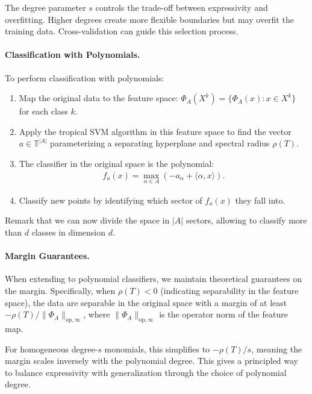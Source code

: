 \documentclass{article}
\newcommand{\trop}{\mathbb{T}}
\begin{document}
The degree parameter $s$ controls the trade-off between expressivity and overfitting. Higher degrees create more flexible boundaries but may overfit the training data. Cross-validation can guide this selection process.

\paragraph{Classification with Polynomials.}\label{subsec:poly_classification}
To perform classification with polynomials:

\begin{enumerate}
    \item Map the original data to the feature space: $\Phi_A(X^k) = \{\Phi_A(x) : x \in X^k\}$ for each class $k$.
    
    \item Apply the tropical SVM algorithm in this feature space to find the vector $a \in \trop^{|A|}$ parameterizing a separating hyperplane and spectral radius $\rho(T)$.
    
    \item The classifier in the original space is the polynomial:
    \begin{align}
    f_a(x) = \max_{\alpha \in A} (-a_\alpha + \langle \alpha, x \rangle).
    \end{align}
    
    \item Classify new points by identifying which sector of $f_a(x)$ they fall into.
\end{enumerate}

Remark that we can now divide the space in $|A|$ sectors, allowing to classify more than $d$ classes in dimension $d$.
\paragraph{Margin Guarantees.}
When extending to polynomial classifiers, we maintain theoretical guarantees on the margin. Specifically, when $\rho(T)<0$ (indicating separability in the feature space), the data are separable in the original space with a margin of at least $-\rho(T)/\lVert \Phi_A\rVert_{\text{op},\infty}$, where $\lVert \Phi_A\rVert_{\text{op},\infty}$ is the operator norm of the feature map.

For homogeneous degree-$s$ monomials, this simplifies to $-\rho(T)/s$, meaning the margin scales inversely with the polynomial degree. This gives a principled way to balance expressivity with generalization through the choice of polynomial degree.
\end{document}
